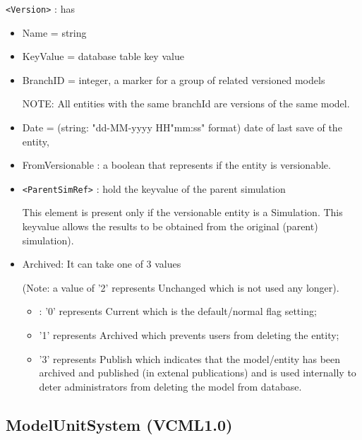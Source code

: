 \verb!<Version>! : has
\begin{itemize}
  \item Name = string
  
  \item KeyValue = database table key value
  
  \item BranchID = integer, a marker for a group of related versioned models 
  
NOTE:  All entities with the same branchId are versions of the same
  model. 
  
  \item Date = (string: "dd-MM-yyyy HH"mm:ss" format) date of last save of the
  entity,
   
  \item FromVersionable : a boolean that represents if the entity is
  versionable. 
  
  \item \verb!<ParentSimRef>! : hold the keyvalue of the parent simulation
  
  This element is present only if the versionable
  entity is a Simulation.  This keyvalue allows the results to be obtained from
  the original (parent) simulation).
  
  \item Archived: It can take one of 3 values
  
  (Note: a value of '2' represents Unchanged which is not used any longer).
  \begin{itemize}
    \item     : '0' represents Current which is the
   default/normal flag setting;
    
    \item  '1' represents Archived which prevents users
   from deleting the entity; 
   
   \item '3' represents Publish which indicates that the
   model/entity has been archived and published (in extenal publications) and is
   used internally to deter administrators from deleting the model from database. 
   
   \end{itemize}    
\end{itemize}

\subsection{ModelUnitSystem (VCML1.0)}
\label{sec:ModelUnitSystem-VCML}

